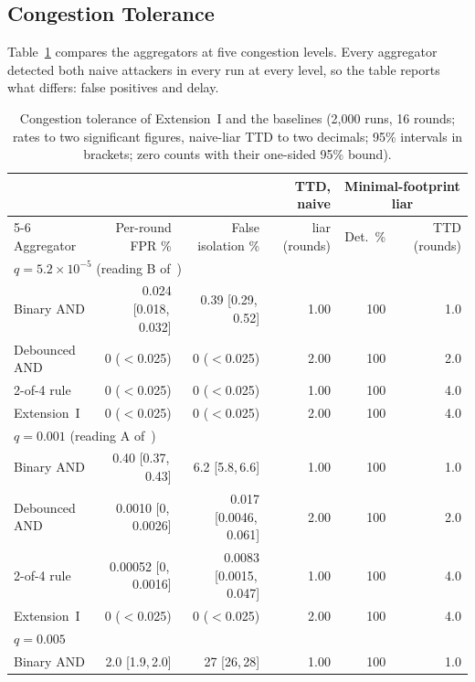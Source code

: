 \documentclass[lineno,pdflatex,sn-nature]{sn-jnl}
\theoremstyle{thmstyleone}%
\theoremstyle{thmstylethree}%
\begin{document}
\subsection{Congestion Tolerance}
\label{sec:res-ext1}
Table~\ref{tab:headline} compares the aggregators at five congestion
levels.  Every aggregator detected both naive attackers in every run at
every level, so the table reports what differs: false positives and
delay.

\begin{table}[!t]
\caption{Congestion tolerance of Extension~I and the baselines (2{,}000 runs, 16 rounds; rates to two significant figures, naive-liar TTD to two decimals; 95\% intervals in brackets; zero counts with their one-sided 95\% bound).}
\label{tab:headline}
\centering
\renewcommand{\arraystretch}{1.05}
\setlength{\tabcolsep}{2.5pt}
\footnotesize
\begin{tabular}{lrrrrr}
\toprule
 & & & {TTD, naive} & \multicolumn{2}{c}{{Minimal-footprint liar}} \\
\cmidrule(lr){5-6}
{Aggregator} & {Per-round FPR \%} & {False isolation \%} &
{liar (rounds)} & {Det.\ \%} & {TTD (rounds)} \\
\midrule
\multicolumn{6}{l}{$q=5.2\times10^{-5}$ (reading B of~\cite{soula2024iodt})} \\
Binary AND~\cite{soula2024iodt} & 0.024 [0.018,\,0.032] & 0.39 [0.29,\,0.52] & 1.00 & 100 & 1.0 \\
Debounced AND & 0 ($<$0.025) & 0 ($<$0.025) & 2.00 & 100 & 2.0 \\
2-of-4 rule & 0 ($<$0.025) & 0 ($<$0.025) & 1.00 & 100 & 4.0 \\
{Extension~I} & 0 ($<$0.025) & 0 ($<$0.025) & 2.00 & 100 & 4.0 \\
\midrule
\multicolumn{6}{l}{$q=0.001$ (reading A of~\cite{soula2024iodt})} \\
Binary AND~\cite{soula2024iodt} & 0.40 [0.37,\,0.43] & 6.2 [5.8,\,6.6] & 1.00 & 100 & 1.0 \\
Debounced AND & 0.0010 [0,\,0.0026] & 0.017 [0.0046,\,0.061] & 2.00 & 100 & 2.0 \\
2-of-4 rule & 0.00052 [0,\,0.0016] & 0.0083 [0.0015,\,0.047] & 1.00 & 100 & 4.0 \\
{Extension~I} & 0 ($<$0.025) & 0 ($<$0.025) & 2.00 & 100 & 4.0 \\
\midrule
\multicolumn{6}{l}{$q=0.005$} \\
Binary AND~\cite{soula2024iodt} & 2.0 [1.9,\,2.0] & 27 [26,\,28] & 1.00 & 100 & 1.0 \\

\end{tabular}
\end{table}
\end{document}
